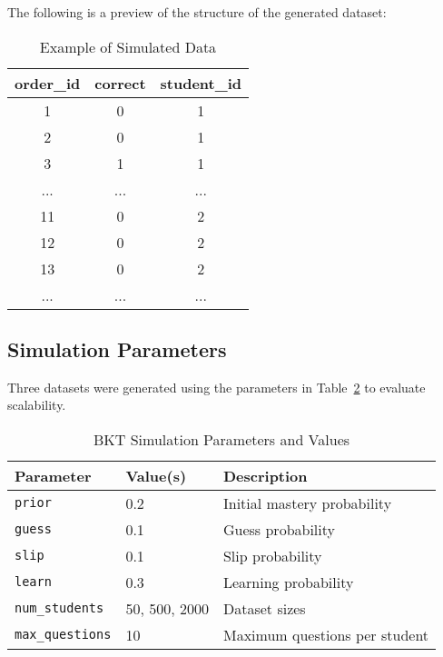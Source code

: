 \documentclass{article}
\begin{document}
The following is a preview of the structure of the generated dataset:

\begin{table}[ht]
\centering
\caption{Example of Simulated Data}
\label{tab:example-data}
\begin{tabular}{|c|c|c|}
\hline
\textbf{order\_id} & \textbf{correct} & \textbf{student\_id} \\ \hline
1 & 0 & 1 \\ \hline
2 & 0 & 1 \\ \hline
3 & 1 & 1 \\ \hline
... & ... & ... \\ \hline
11 & 0 & 2 \\ \hline
12 & 0 & 2 \\ \hline
13 & 0 & 2 \\ \hline
... & ... & ... \\ \hline
\end{tabular}
\end{table}

\subsection{Simulation Parameters}
Three datasets were generated using the parameters in Table~\ref{tab:sim_params} to evaluate scalability.

\begin{table}[H]
\centering
\caption{BKT Simulation Parameters and Values}
\label{tab:sim_params}
\begin{tabular}{@{}lll@{}}
\toprule
\textbf{Parameter} & \textbf{Value(s)} & \textbf{Description} \\
\midrule
\texttt{prior} & 0.2 & Initial mastery probability \\
\texttt{guess} & 0.1 & Guess probability \\
\texttt{slip} & 0.1 & Slip probability \\
\texttt{learn} & 0.3 & Learning probability \\
\texttt{num\_students} & 50, 500, 2000 & Dataset sizes \\
\texttt{max\_questions} & 10 & Maximum questions per student \\
\bottomrule
\end{tabular}
\end{table}
\end{document}
